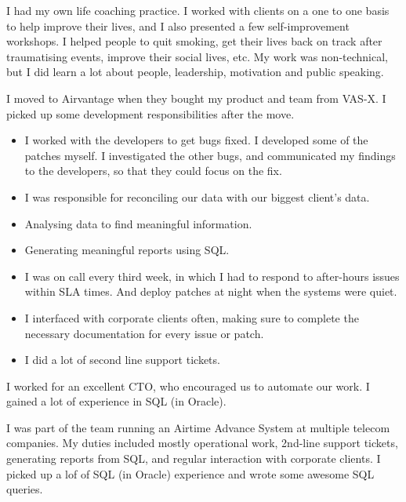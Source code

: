 \documentclass[a4paper]{twentysecondcv} %
\begin{document}
\begin{twenty}
    {I had my own life coaching practice. I worked with clients on a one to one basis to help improve their lives, and I also presented a few self-improvement workshops. I helped people to quit smoking, get their lives back on track after traumatising events, improve their social lives, etc. My work was non-technical, but I did learn a lot about people, leadership, motivation and public speaking.}
    {I moved to Airvantage when they bought my product and team from VAS-X. I picked up some development responsibilities after the move.
    \begin{itemize}
        \item I worked with the developers to get bugs fixed. I developed some of the patches myself. I investigated the other bugs, and communicated my findings to the developers, so that they could focus on the fix.
        \item I was responsible for reconciling our data with our biggest client's data.
        \item Analysing data to find meaningful information.
        \item Generating meaningful reports using SQL.
        \item I was on call every third week, in which I had to respond to after-hours issues within SLA times. And deploy patches at night when the systems were quiet.
        \item I interfaced with corporate clients often, making sure to complete the necessary documentation for every issue or patch.
        \item I did a lot of second line support tickets.
    \end{itemize}
    I worked for an excellent CTO, who encouraged us to automate our work. I gained a lot of experience in SQL (in Oracle).}
    {I was part of the team running an Airtime Advance System at multiple telecom companies. My duties included mostly operational work, 2nd-line support tickets, generating reports from SQL, and regular interaction with corporate clients. I picked up a lof of SQL (in Oracle) experience and wrote some awesome SQL queries.}


\end{twenty}
\end{document}
